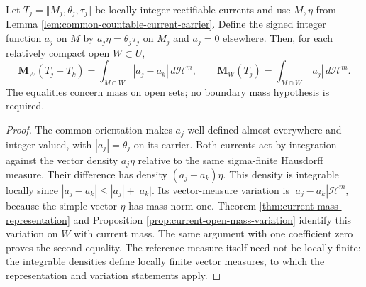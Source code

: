 \begin{lemma}\label{lem:current-common-carrier-mass-distance}
Let $T_j=\llbracket M_j,\theta_j,\tau_j\rrbracket$ be locally integer rectifiable currents and use $M,\eta$ from Lemma \ref{lem:common-countable-current-carrier}. Define the signed integer function $a_j$ on $M$ by $a_j\eta=\theta_j\tau_j$ on $M_j$ and $a_j=0$ elsewhere. Then, for each relatively compact open $W\subset U$,
\[
 \mathbf M_W(T_j-T_k)
 =\int_{M\cap W}|a_j-a_k|\,d\mathcal H^m,
 \qquad
 \mathbf M_W(T_j)=\int_{M\cap W}|a_j|\,d\mathcal H^m.
\]
The equalities concern mass on open sets; no boundary mass hypothesis is required.
\end{lemma}
\begin{proof}
The common orientation makes $a_j$ well defined almost everywhere and integer valued, with $|a_j|=\theta_j$ on its carrier. Both currents act by integration against the vector density $a_j\eta$ relative to the same sigma-finite Hausdorff measure. Their difference has density $(a_j-a_k)\eta$. This density is integrable locally since $|a_j-a_k|\leq|a_j|+|a_k|$. Its vector-measure variation is $|a_j-a_k|\mathcal H^m$, because the simple vector $\eta$ has mass norm one. Theorem \ref{thm:current-mass-representation} and Proposition \ref{prop:current-open-mass-variation} identify this variation on $W$ with current mass. The same argument with one coefficient zero proves the second equality. The reference measure itself need not be locally finite: the integrable densities define locally finite vector measures, to which the representation and variation statements apply.
\end{proof}

